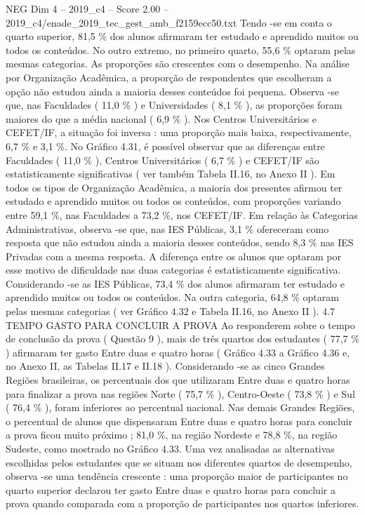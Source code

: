 \begin{textsample}{NEG Dim 4 – 2019\_c4 – Score 2.00 – 2019\_c4/enade\_2019\_tec\_gest\_amb\_f2159ecc50.txt}
Tendo -se em conta o quarto superior, 81,5 \% dos alunos afirmaram ter estudado e aprendido muitos ou todos os conteúdos.
No outro extremo, no primeiro quarto, 55,6 \% optaram pelas mesmas categorias.
As proporções são crescentes com o desempenho.
Na análise por Organização Acadêmica, a proporção de respondentes que escolheram a opção não estudou ainda a maioria desses conteúdos foi pequena.
Observa -se que, nas Faculdades ( 11,0 \% ) e Universidades ( 8,1 \% ), as proporções foram maiores do que a média nacional ( 6,9 \% ).
Nos Centros Universitários e CEFET/IF, a situação foi inversa : uma proporção mais baixa, respectivamente, 6,7 \% e 3,1 \%.
No Gráfico 4.31, é possível observar que as diferenças entre Faculdades ( 11,0 \% ), Centros Universitários ( 6,7 \% ) e CEFET/IF são estatisticamente significativas ( ver também Tabela II.16, no Anexo II ).
Em todos os tipos de Organização Acadêmica, a maioria dos presentes afirmou ter estudado e aprendido muitos ou todos os conteúdos, com proporções variando entre 59,1 \%, nas Faculdades a 73,2 \%, nos CEFET/IF.
Em relação às Categorias Administrativas, observa -se que, nas IES Públicas, 3,1 \% ofereceram como resposta que não estudou ainda a maioria desses conteúdos, sendo 8,3 \% nas IES Privadas com a mesma resposta.
A diferença entre os alunos que optaram por esse motivo de dificuldade nas duas categorias é estatisticamente significativa.
Considerando -se as IES Públicas, 73,4 \% dos alunos afirmaram ter estudado e aprendido muitos ou todos os conteúdos.
Na outra categoria, 64,8 \% optaram pelas mesmas categorias ( ver Gráfico 4.32 e Tabela II.16, no Anexo II ). 4.7 TEMPO GASTO PARA CONCLUIR A PROVA Ao responderem sobre o tempo de conclusão da prova ( Questão 9 ), mais de três quartos dos estudantes ( 77,7 \% ) afirmaram ter gasto Entre duas e quatro horas ( Gráfico 4.33 a Gráfico 4.36 e, no Anexo II, as Tabelas II.17 e II.18 ).
Considerando -se as cinco Grandes Regiões brasileiras, os percentuais dos que utilizaram Entre duas e quatro horas para finalizar a prova nas regiões Norte ( 75,7 \% ), Centro-Oeste ( 73,8 \% ) e Sul ( 76,4 \% ), foram inferiores ao percentual nacional.
Nas demais Grandes Regiões, o percentual de alunos que dispensaram Entre duas e quatro horas para concluir a prova ficou muito próximo ; 81,0 \%, na região Nordeste e 78,8 \%, na região Sudeste, como mostrado no Gráfico 4.33.
Uma vez analisadas as alternativas escolhidas pelos estudantes que se situam nos diferentes quartos de desempenho, observa -se uma tendência crescente : uma proporção maior de participantes no quarto superior declarou ter gasto Entre duas e quatro horas para concluir a prova quando comparada com a proporção de participantes nos quartos inferiores.

\end{textsample}

